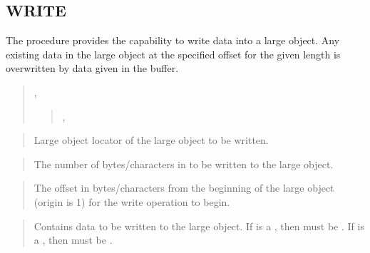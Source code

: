 \documentclass[letterpaper,10pt,english,openany,oneside]{sphinxmanual}
\begin{document}
\subsection{WRITE}
\label{\detokenize{write::doc}}\label{\detokenize{write:write}}
The  procedure provides the capability to write data into a large
object. Any existing data in the large object at the specified offset
for the given length is overwritten by data given in the buffer.
\begin{quote}

,
\begin{quote}

,

\end{quote}
\end{quote}


\begin{quote}

Large object locator of the large object to be written.
\end{quote}

\begin{quote}

The number of bytes/characters in  to be written to the large
object.
\end{quote}

\begin{quote}

The offset in bytes/characters from the beginning of the large object
(origin is 1) for the write operation to begin.
\end{quote}

\begin{quote}

Contains data to be written to the large object. If  is a
, then  must be . If  is a , then 
must be .
\end{quote}
\end{document}
